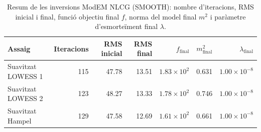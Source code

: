 \begin{table}[htbp]
  \centering
  \caption{Resum de les inversions ModEM NLCG (SMOOTH): nombre d'iteracions, RMS inicial i final, funció objectiu final $f$, norma del model final $m^2$ i paràmetre d'esmorteïment final $\lambda$.}
  \label{tab:modem_runs_smooth}
  \begin{tabular}{l r r r r r r}
    \toprule
    Assaig & Iteracions & RMS inicial & RMS final & $f_\text{final}$ & $m^2_\text{final}$ & $\lambda_\text{final}$ \\
    \midrule
    Suavitzat LOWESS 1 & 115 & 47.78 & 13.51 & $1.83\times10^{2}$ & 0.631 & $1.00\times10^{-8}$ \\
    Suavitzat LOWESS 2 & 123 & 48.27 & 13.33 & $1.78\times10^{2}$ & 0.746 & $1.00\times10^{-8}$ \\
    Suavitzat Hampel & 129 & 47.58 & 12.69 & $1.61\times10^{2}$ & 0.661 & $1.00\times10^{-8}$ \\
    \bottomrule
  \end{tabular}
\end{table}
